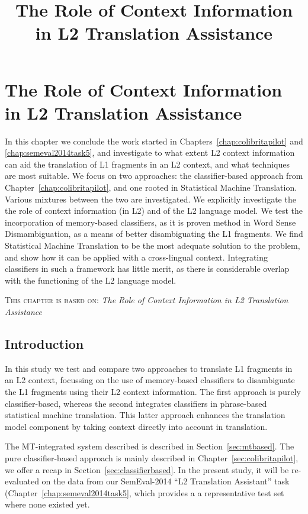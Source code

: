 
\chapter{The Role of Context Information in L2 Translation Assistance}
\title{The Role of Context Information in L2 Translation Assistance}
\label{chap:colibritafinal}



In this chapter we conclude the work started in
Chapters~\ref{chap:colibritapilot} and \ref{chap:semeval2014task5}, and
investigate to what extent L2 context information can aid the translation of L1
fragments in an L2 context, and what techniques are most suitable. We focus on
two approaches: the classifier-based approach from
Chapter~\ref{chap:colibritapilot}, and one rooted in Statistical
Machine Translation.  Various mixtures between the two are investigated. We
explicitly investigate the the role of context information (in L2) and of the
L2 language model. We test the incorporation of memory-based classifiers, as it
is proven method in Word Sense Dismambiguation, as a means of better
disambiguating the L1 fragments.  We find Statistical Machine Translation to be
the most adequate solution to the problem, and show how it can be applied with
a cross-lingual context. Integrating classifiers in such a framework has
little merit, as there is considerable overlap with the functioning of the L2
language model.

\textsc{This chapter is based on: } \emph{The Role of Context Information in L2 Translation Assistance}

  
\section{Introduction}

In this study we test and compare two approaches to translate L1 fragments in
an L2 context, focussing on the use of memory-based classifiers to disambiguate
the L1 fragments using their L2 context information. The first approach is
purely classifier-based, whereas the second integrates classifiers in
phrase-based statistical machine translation. This latter approach enhances the
translation model component by taking context directly into account in
translation. 

The MT-integrated system described is described in Section~\ref{sec:mtbased}.
The pure classifier-based approach is mainly described in
Chapter~\ref{sec:colibritapilot}, we offer a recap in
Section~\ref{sec:classifierbased}. In the present study, it will be re-evaluated on the
data from our SemEval-2014 ``L2 Translation Assistant'' task
(Chapter~\ref{chap:semeval2014task5}, which provides a
a representative test set where none existed yet.

